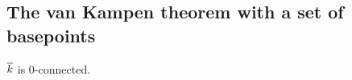 \documentclass[hott-all.tex]{subfiles}
\begin{document}
\subsection{The van Kampen theorem with a set of basepoints}
% 
% 
% 
\begin{lem}
  $\overline{k}$ is 0-connected.
\end{lem}
% 
\end{document}
